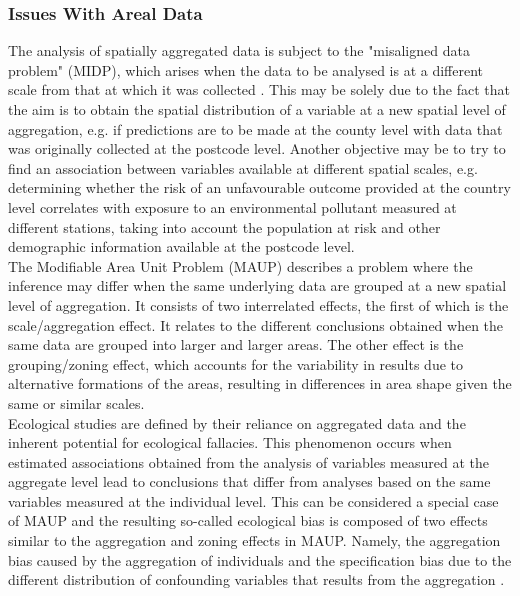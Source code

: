 \subsubsection{Issues With Areal Data}
The analysis of spatially aggregated data is subject to the "misaligned data problem" (MIDP), which arises when the data to be analysed is at a different scale from that at which it was collected \autocite[][]{banerjee2014hierarchical}. This may be solely due to the fact that the aim is to obtain the spatial distribution of a variable at a new spatial level of aggregation, e.g. if predictions are to be made at the county level with data that was originally collected at the postcode level. Another objective may be to try to find an association between variables available at different spatial scales, e.g. determining whether the risk of an unfavourable outcome provided at the country level correlates with exposure to an environmental pollutant measured at different stations, taking into account the population at risk and other demographic information available at the postcode level.\\
The Modifiable Area Unit Problem (MAUP) \autocite[][]{openshaw1984modifiable} describes a problem where the inference may differ when the same underlying data are grouped at a new spatial level of aggregation. It consists of two interrelated effects, the first of which is the scale/aggregation effect. It relates to the different conclusions obtained when the same data are grouped into larger and larger areas. The other effect is the grouping/zoning effect, which accounts for the variability in results due to alternative formations of the areas, resulting in differences in area shape given the same or similar scales. \\
Ecological studies are defined by their reliance on aggregated data \autocite[][]{robinson2009ecological} and the inherent potential for ecological fallacies. This phenomenon occurs when estimated associations obtained from the analysis of variables measured at the aggregate level lead to conclusions that differ from analyses based on the same variables measured at the individual level. This can be considered a special case of MAUP and the resulting so-called ecological bias is composed of two effects similar to the aggregation and zoning effects in MAUP. Namely, the aggregation bias caused by the aggregation of individuals and the specification bias due to the different distribution of confounding variables that results from the aggregation \autocite[][]{gotway2002combining, moraga2019geospatial}.